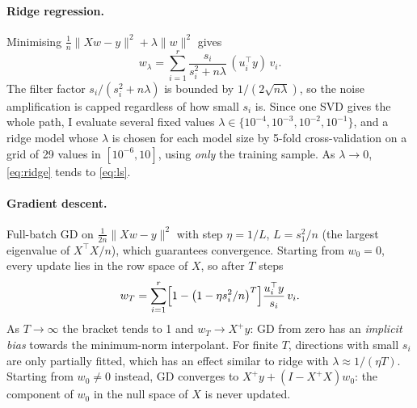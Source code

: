 \documentclass[10pt,a4paper]{article}
\newcommand{\norm}[1]{\lVert #1 \rVert}
\begin{document}
\paragraph{Ridge regression.} Minimising $\frac1n\norm{Xw-y}^2+\lambda\norm{w}^2$ gives
\begin{equation}\label{eq:ridge}
  w_\lambda = \sum_{i=1}^{r} \frac{s_i}{s_i^2+n\lambda}\,(u_i^\top y)\, v_i .
\end{equation}
The filter factor $s_i/(s_i^2+n\lambda)$ is bounded by $1/(2\sqrt{n\lambda})$, so the noise amplification is capped regardless of how small $s_i$ is. Since one SVD gives the whole path, I evaluate several fixed values $\lambda\in\{10^{-4},10^{-3},10^{-2},10^{-1}\}$, and a ridge model whose $\lambda$ is chosen for each model size by 5-fold cross-validation on a grid of 29 values in $[10^{-6},10]$, using \emph{only} the training sample. As $\lambda\to0$, \eqref{eq:ridge} tends to \eqref{eq:ls}.

\paragraph{Gradient descent.} Full-batch GD on $\frac1{2n}\norm{Xw-y}^2$ with step $\eta=1/L$, $L = s_1^2/n$ (the largest eigenvalue of $X^\top X/n$), which guarantees convergence. Starting from $w_0=0$, every update lies in the row space of $X$, so after $T$ steps
\begin{equation}\label{eq:gd}
  w_T = \sum_{i=1}^r \Bigl[1-\bigl(1-\eta s_i^2/n\bigr)^T\Bigr]\frac{u_i^\top y}{s_i}\, v_i .
\end{equation}
As $T\to\infty$ the bracket tends to 1 and $w_T\to X^+y$: GD from zero has an \emph{implicit bias} towards the minimum-norm interpolant. For finite $T$, directions with small $s_i$ are only partially fitted, which has an effect similar to ridge with $\lambda\approx 1/(\eta T)$. Starting from $w_0\ne0$ instead, GD converges to $X^+y + (I-X^+X)w_0$: the component of $w_0$ in the null space of $X$ is never updated.
\end{document}
